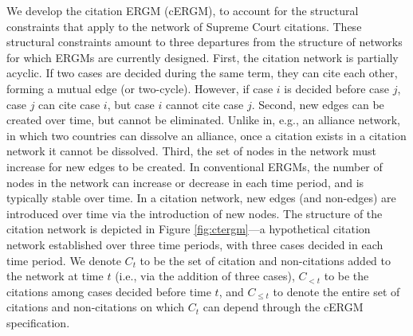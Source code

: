 \documentclass{cup-pan}
\begin{document}
We develop the citation ERGM (cERGM), to account for the structural constraints that apply to the network of Supreme Court citations. These structural constraints amount to three departures from the structure of networks for which ERGMs are currently designed. First, the citation network is partially acyclic. If two cases are decided during the same term, they can cite each other, forming a mutual edge (or two-cycle). However, if case $i$ is decided before case $j$, case $j$ can cite case $i$, but case $i$ cannot cite case $j$. Second, new edges can be created over time, but cannot be eliminated. Unlike in, e.g., an alliance network, in which two countries can dissolve an alliance, once a citation exists in a citation network it cannot be dissolved. Third, the set of nodes in the network must increase for new edges to be created. In conventional ERGMs, the number of nodes in the network can increase or decrease in each time period, and is typically stable over time. In a citation network, new edges (and non-edges) are introduced over time via the introduction of new nodes. The structure of the citation network is depicted in Figure \ref{fig:ctergm}---a hypothetical citation network established over three time periods, with three cases decided in each time period. We denote $C_t$ to be the set of citation and non-citations added to the network at time $t$ (i.e., via the addition of three cases), $C_{ <t}$ to be the citations among cases decided before time $t$, and $C_{ \leq t}$ to denote the entire set of citations and non-citations on which $C_t$ can depend through the cERGM specification.
\end{document}
